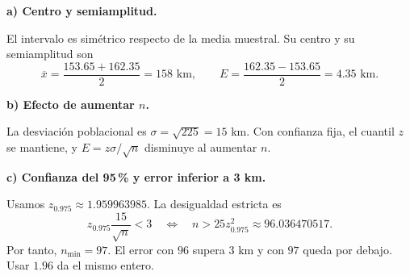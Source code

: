 \textbf{a) Centro y semiamplitud.}\par\nopagebreak[4]
El intervalo es simétrico respecto de la media muestral. Su centro y su semiamplitud son
\[
\boxed{\overline x=\frac{153.65+162.35}{2}=158\text{ km}},\qquad
\boxed{E=\frac{162.35-153.65}{2}=4.35\text{ km}}.
\]

\textbf{b) Efecto de aumentar $n$.}\par\nopagebreak[4]
La desviación poblacional es $\sigma=\sqrt{225}=15$ km. Con confianza fija, el cuantil $z$ se mantiene, y $E=z\sigma/\sqrt n$ disminuye al aumentar $n$.

\textbf{c) Confianza del 95\,\% y error inferior a 3 km.}\par\nopagebreak[4]
Usamos $z_{0.975}\approx1.959963985$. La desigualdad estricta es
\[
z_{0.975}\frac{15}{\sqrt n}<3
\quad\Longleftrightarrow\quad n>25z_{0.975}^2\approx96.036470517.
\]
Por tanto, $\boxed{n_{\min}=97}$. El error con $96$ supera $3$ km y con $97$ queda por debajo. Usar $1.96$ da el mismo entero.
